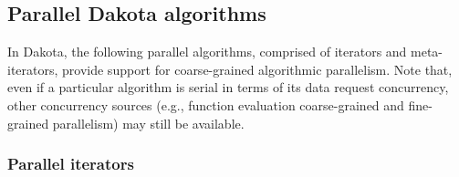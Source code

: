 

\subsection{Parallel Dakota algorithms} \label{parallel:algorithms}

In Dakota, the following parallel algorithms, comprised of iterators
and meta-iterators, provide support for coarse-grained algorithmic
parallelism.  Note that, even if a particular algorithm is serial in
terms of its data request concurrency, other concurrency sources
(e.g., function evaluation coarse-grained and fine-grained
parallelism) may still be available.

\subsubsection{Parallel iterators}\label{parallel:algorithms:iterators}

